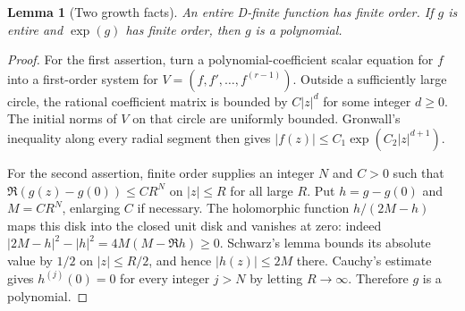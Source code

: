 \documentclass[11pt,a4paper]{article}
\newtheorem{lemma}[theorem]{Lemma}
\theoremstyle{definition}
\theoremstyle{remark}
\numberwithin{equation}{section}
\begin{document}
\begin{lemma}[Two growth facts]
\label{p6:phn:growth}
An entire D-finite function has finite order.  If $g$ is entire
and $\exp(g)$ has finite order, then $g$ is a polynomial.
\end{lemma}
\begin{proof}
For the first assertion, turn a polynomial-coefficient scalar
equation for $f$ into a first-order system for
$V=(f,f',\ldots,f^{(r-1)})$.  Outside a sufficiently large circle,
the rational coefficient matrix is bounded by $C|z|^d$ for some
integer $d\geq0$.  The initial norms of $V$ on that circle are
uniformly bounded.  Gronwall's inequality along every radial segment
then gives $|f(z)|\leq C_1\exp(C_2|z|^{d+1})$.

For the second assertion, finite order supplies an integer $N$ and
$C>0$ such that $\Re(g(z)-g(0))\leq C R^N$ on $|z|\leq R$ for
all large $R$.  Put $h=g-g(0)$ and $M=C R^N$, enlarging $C$ if
necessary.  The holomorphic function $h/(2M-h)$ maps this disk into
the closed unit disk and vanishes at zero: indeed
$|2M-h|^2-|h|^2=4M(M-\Re h)\geq0$.
Schwarz's lemma bounds its absolute value by $1/2$ on
$|z|\leq R/2$, and hence $|h(z)|\leq2M$ there.
Cauchy's estimate gives $h^{(j)}(0)=0$ for every integer $j>N$
by letting $R\to\infty$.  Therefore $g$ is a polynomial.
\end{proof}
\end{document}
